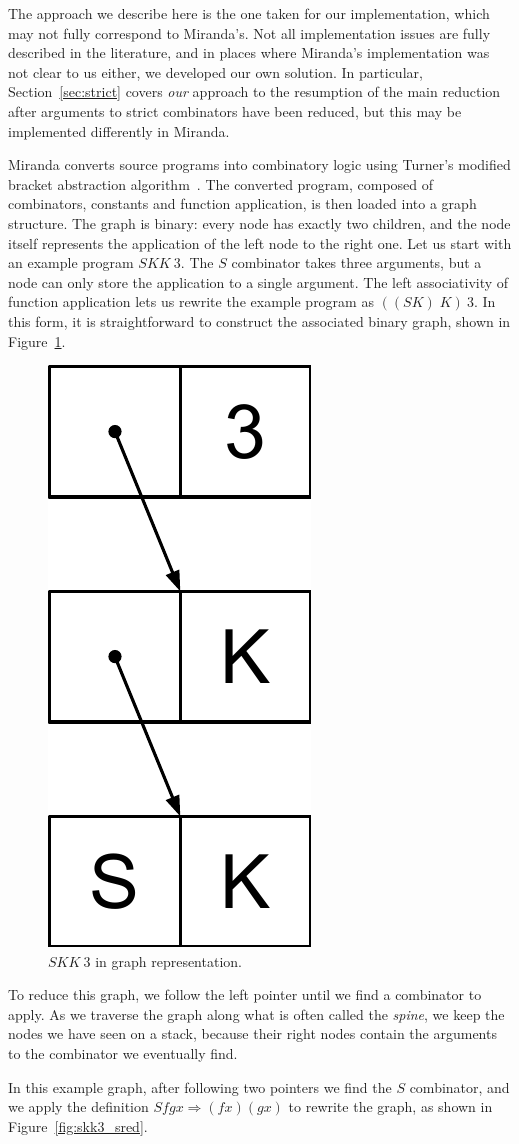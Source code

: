 \documentclass[conference]{IEEEtran}
\begin{document}
The approach we describe here is the one taken for our implementation, which may not fully correspond to Miranda's.
Not all implementation issues are fully described in the literature, and in places where Miranda's implementation was not clear to us either, we developed our own solution.
In particular, Section~\ref{sec:strict} covers \emph{our} approach to the resumption of the main reduction after arguments to strict combinators have been reduced, but this may be implemented differently in Miranda.

Miranda converts source programs into combinatory logic using Turner's modified bracket abstraction algorithm~\cite{turner_another_1979}.
The converted program, composed of combinators, constants and function application, is then loaded into a graph structure.
The graph is binary: every node has exactly two children, and the node itself represents the application of the left node to the right one.
Let us start with an example program $SKK \ 3$.
The $S$ combinator takes three arguments, but a node can only store the application to a single argument.
The left associativity of function application lets us rewrite the example program as $((SK) \; K)\ 3$.
In this form, it is straightforward to construct the associated binary graph, shown in Figure~\ref{fig:skk3}.

\begin{figure}
    \includegraphics[width=.15\columnwidth]{skk3}
    \centering
    \caption{$SKK \ 3$ in graph representation.}
    \label{fig:skk3}
\end{figure}

To reduce this graph, we follow the left pointer until we find a combinator to apply.
As we traverse the graph along what is often called the \textit{spine}, we keep the nodes we have seen on a stack, because their right nodes contain the arguments to the combinator we eventually find.

In this example graph, after following two pointers we find the $S$ combinator, and we apply the definition $S f g x \Rightarrow (f x) (g x)$ to rewrite the graph, as shown in Figure~\ref{fig:skk3_sred}.
\end{document}
